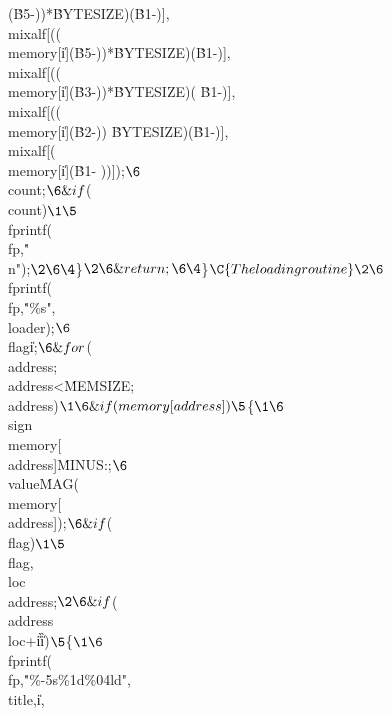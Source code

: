 \AND(\.{B5}-))\GG{}*\.{BYTESIZE})\AND(\.{B1}-)],\\{mixalf}[((%
\\{memory}[\|i]\AND(\.{B5}-))\GG{}*\.{BYTESIZE})\AND(\.{B1}-)],%
\\{mixalf}[((\\{memory}[\|i]\AND(\.{B3}-))\GG{}*\.{BYTESIZE})\AND(%
\.{B1}-)],\\{mixalf}[((\\{memory}[\|i]\AND(\.{B2}-))\GG%
\.{BYTESIZE})\AND(\.{B1}-)],\\{mixalf}[(\\{memory}[\|i]\AND(\.{B1}-%
))]);{}$\6
${}\\{count}\PP;{}$\6
\&{if} ${}(\\{count}\MOD{}\E{}){}$\1\5
${}\\{fprintf}(\\{fp},\.{"\\n"});{}$\2\6
\4${}\}{}$\2\6
\&{return};\6
\4${}\}{}$\C{ The loading routine }\2\6
${}\\{fprintf}(\\{fp},\.{"\%s"},\\{loader});{}$\6
${}\\{flag}\K\|i\K{};{}$\6
\&{for} ${}(\\{address}\K{};{}$ ${}\\{address}<\.{MEMSIZE};{}$ ${}%
\\{address}\PP){}$\1\6
\&{if} (\\{memory}[\\{address}])\5
${}\{{}$\1\6
${}\\{sign}\K\\{memory}[\\{address}]\AND\.{MINUS}\?{-}:;{}$\6
${}\\{value}\K\.{MAG}(\\{memory}[\\{address}]);{}$\6
\&{if} ${}(\R\\{flag}){}$\1\5
${}\\{flag}\K{},\\{loc}\K\\{address};{}$\2\6
\&{if} ${}(\\{address}\I\\{loc}+\|i\V\|i\G{}){}$\5
${}\{{}$\1\6
${}\\{fprintf}(\\{fp},\.{"\%-5s\%1d\%04ld"},\\{title},\|i,%
